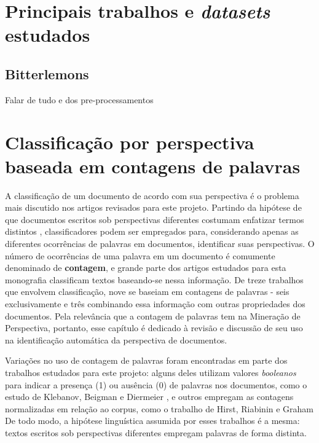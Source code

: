 \chapter{Principais trabalhos e \emph{datasets} estudados}

\section{Bitterlemons}
\label{bitter}

Falar de tudo e dos pre-processamentos

\chapter{Classificação por perspectiva baseada em contagens de palavras}
\label{chap3}

A classificação de um documento de acordo com sua perspectiva é o problema mais discutido nos artigos revisados para este projeto. Partindo da hipótese de que documentos escritos sob perspectivas diferentes costumam enfatizar termos distintos \cite{teubert}, classificadores podem ser empregados para, considerando apenas as diferentes ocorrências de palavras em documentos, identificar suas perspectivas. O número de ocorrências de uma palavra em um documento é comumente denominado de \textbf{contagem}, e grande parte dos artigos estudados para esta monografia classificam textos baseando-se nessa informação. De treze trabalhos que envolvem classificação, nove se baseiam em contagens de palavras - seis exclusivamente e três combinando essa informação com outras propriedades dos documentos. Pela relevância que a contagem de palavras tem na Mineração de Perspectiva, portanto, esse capítulo é dedicado à revisão e discussão de seu uso na identificação automática da perspectiva de documentos.


Variações no uso de contagem de palavras foram encontradas em parte dos trabalhos estudados para este projeto: alguns deles utilizam valores \emph{booleanos} para indicar a presença (1) ou ausência (0) de palavras nos documentos, como o estudo de Klebanov, Beigman e Diermeier \cite{klebanov}, e outros empregam  as contagens normalizadas em relação ao corpus, como o trabalho de Hirst, Riabinin e Graham \cite{hirst-et-al} De todo modo, a hipótese linguística assumida por esses trabalhos é a mesma: textos escritos sob perspectivas diferentes empregam palavras de forma distinta. %

